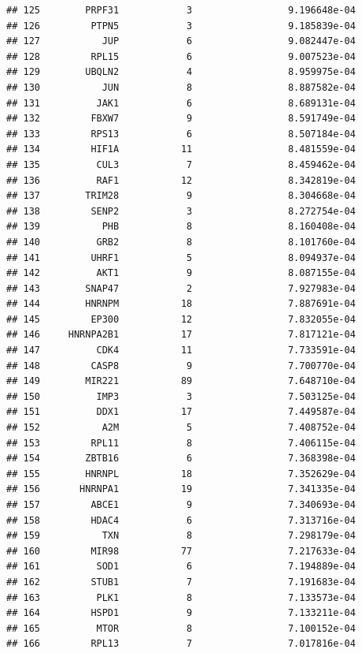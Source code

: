 \documentclass[
]{article}
\begin{document}
\begin{verbatim}
## 125        PRPF31            3                 9.196648e-04
## 126         PTPN5            3                 9.185839e-04
## 127           JUP            6                 9.082447e-04
## 128         RPL15            6                 9.007523e-04
## 129        UBQLN2            4                 8.959975e-04
## 130           JUN            8                 8.887582e-04
## 131          JAK1            6                 8.689131e-04
## 132         FBXW7            9                 8.591749e-04
## 133         RPS13            6                 8.507184e-04
## 134         HIF1A           11                 8.481559e-04
## 135          CUL3            7                 8.459462e-04
## 136          RAF1           12                 8.342819e-04
## 137        TRIM28            9                 8.304668e-04
## 138         SENP2            3                 8.272754e-04
## 139           PHB            8                 8.160408e-04
## 140          GRB2            8                 8.101760e-04
## 141         UHRF1            5                 8.094937e-04
## 142          AKT1            9                 8.087155e-04
## 143        SNAP47            2                 7.927983e-04
## 144        HNRNPM           18                 7.887691e-04
## 145         EP300           12                 7.832055e-04
## 146     HNRNPA2B1           17                 7.817121e-04
## 147          CDK4           11                 7.733591e-04
## 148         CASP8            9                 7.700770e-04
## 149        MIR221           89                 7.648710e-04
## 150          IMP3            3                 7.503125e-04
## 151          DDX1           17                 7.449587e-04
## 152           A2M            5                 7.408752e-04
## 153         RPL11            8                 7.406115e-04
## 154        ZBTB16            6                 7.368398e-04
## 155        HNRNPL           18                 7.352629e-04
## 156       HNRNPA1           19                 7.341335e-04
## 157         ABCE1            9                 7.340693e-04
## 158         HDAC4            6                 7.313716e-04
## 159           TXN            8                 7.298179e-04
## 160         MIR98           77                 7.217633e-04
## 161          SOD1            6                 7.194889e-04
## 162         STUB1            7                 7.191683e-04
## 163          PLK1            8                 7.133573e-04
## 164         HSPD1            9                 7.133211e-04
## 165          MTOR            8                 7.100152e-04
## 166         RPL13            7                 7.017816e-04

\end{verbatim}
\end{document}
